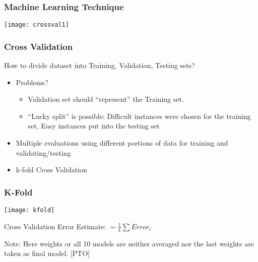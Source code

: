 \begin{frame}[fragile]\frametitle{Machine Learning Technique}
\begin{center}
\texttt{[image: crossval1]}
\end{center}
\end{frame}




\begin{frame}[fragile]\frametitle{Cross Validation}
How to divide dataset into Training, Validation, Testing sets?
\begin{itemize}
\item Problems?
	\begin{itemize}
	\item Validation set should ``represent'' the Training set.
	\item ``Lucky split'' is possible: Difficult instances were chosen for the training set, Easy instances put into the testing set
	\end{itemize}
\item Multiple evaluations using different portions of data for training and validating/testing
\item k-fold Cross Validation
\end{itemize}
\end{frame}

\begin{frame}[fragile]\frametitle{K-Fold}
\begin{center}
\texttt{[image: kfold]}
\end{center}

Cross Validation Error Estimate: $= \frac{1}{k} \sum Error_i$

Note: Here weights or all 10 models are neither averaged nor the last weights are taken as final model. [PTO]
\end{frame}




